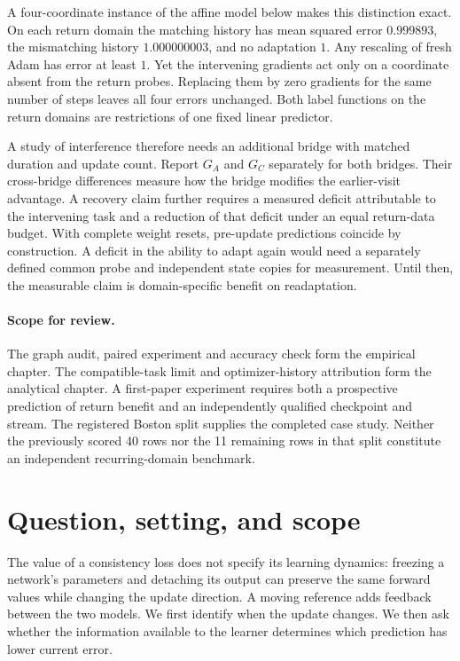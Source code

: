 \documentclass[11pt,a4paper]{article}
\begin{document}
A four-coordinate instance of the affine model below makes this distinction
exact. On each return domain the matching history has mean squared error
$0.999893$, the mismatching history $1.000000003$, and no adaptation
$1$. Any rescaling of fresh Adam has error at least $1$. Yet the
intervening gradients act only on a coordinate absent from the return
probes. Replacing them by zero gradients for the same number of steps
leaves all four errors unchanged. Both label functions on the return
domains are restrictions of one fixed linear predictor.

A study of interference therefore needs an additional bridge with matched
duration and update count. Report $G_A$ and $G_C$ separately for both
bridges. Their cross-bridge differences measure how the bridge modifies
the earlier-visit advantage. A recovery claim further requires a measured
deficit attributable to the intervening task and a reduction of that
deficit under an equal return-data budget. With complete weight resets,
pre-update predictions coincide by construction. A deficit in the ability
to adapt again would need a separately defined common probe and independent
state copies for measurement. Until then, the measurable claim is
domain-specific benefit on readaptation.

\paragraph{Scope for review.}
The graph audit, paired experiment and accuracy check form the empirical
chapter. The compatible-task limit and optimizer-history attribution form
the analytical chapter. A first-paper experiment requires both a
prospective prediction of return benefit and an independently qualified
checkpoint and stream. The registered Boston split supplies the completed
case study. Neither the previously scored 40 rows nor the 11 remaining
rows in that split constitute an independent recurring-domain benchmark.

\section{Question, setting, and scope}
The value of a consistency loss does not specify its learning dynamics:
freezing a network's parameters and detaching its output can preserve the
same forward values while changing the update direction. A moving reference
adds feedback between the two models. We first identify when the update
changes. We then ask whether the information available to the learner
determines which prediction has lower current error.
\end{document}

